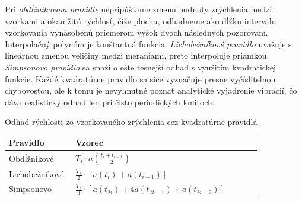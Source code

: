 Pri \emph{obdĺžníkovom pravidle} nepripúšťame zmenu hodnoty zrýchlenia medzi vzorkami a okamžitú rýchlosť, čiže plochu, odhadneme ako
dĺžku intervalu vzorkovania vynásobenú priemerom výšok dvoch následných pozorovaní. Interpolačný polynóm je konštantná funkcia.
\emph{Lichobežníkové pravidlo} uvažuje s lineárnou zmenou veličiny medzi meraniami, preto interpoluje priamkou.
\emph{Simpsonovo pravidlo} sa snaží o ešte tesnejší odhad s využitím kvadratickej funkcie. Každé kvadratúrne pravidlo sa síce
vyznačuje presne vyčísliteľnou chybovosťou, ale k tomu je nevyhnutné poznať analytické vyjadrenie vibrácií, čo dáva realistický odhad
len pri čisto periodických kmitoch.

\begin{table}[h]
\centering
\def\arraystretch{2}
\begin{tabular}{|p{0.25\linewidth}|p{0.7\linewidth}|}
\hline
\textbf{Pravidlo} & \textbf{Vzorec}                                                      \\ \hline
Obdĺžnikové       & $ T_s \cdot a(\frac{t_i + t_{i-1}}{2}) $                             \\ \hline
Lichobežníkové    & $ \frac{T_s}{2} \cdot [a(t_i) + a(t_{i-1})] $                        \\ \hline
Simpsonovo        & $ \frac{T_s}{3} \cdot [a(t_{2i}) + 4a(t_{2i - 1}) + a(t_{2i - 2})] $ \\ \hline
\end{tabular}
\caption{Odhad rýchlosti zo vzorkovaného zrýchlenia cez kvadratúrne pravidlá}
\end{table}

